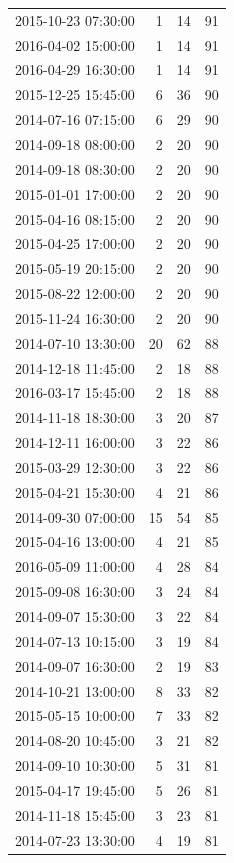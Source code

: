 \begin{tabular}{lrrr}
2015-10-23 07:30:00 & 1 & 14 & 91 \\
2016-04-02 15:00:00 & 1 & 14 & 91 \\
2016-04-29 16:30:00 & 1 & 14 & 91 \\
2015-12-25 15:45:00 & 6 & 36 & 90 \\
2014-07-16 07:15:00 & 6 & 29 & 90 \\
2014-09-18 08:00:00 & 2 & 20 & 90 \\
2014-09-18 08:30:00 & 2 & 20 & 90 \\
2015-01-01 17:00:00 & 2 & 20 & 90 \\
2015-04-16 08:15:00 & 2 & 20 & 90 \\
2015-04-25 17:00:00 & 2 & 20 & 90 \\
2015-05-19 20:15:00 & 2 & 20 & 90 \\
2015-08-22 12:00:00 & 2 & 20 & 90 \\
2015-11-24 16:30:00 & 2 & 20 & 90 \\
2014-07-10 13:30:00 & 20 & 62 & 88 \\
2014-12-18 11:45:00 & 2 & 18 & 88 \\
2016-03-17 15:45:00 & 2 & 18 & 88 \\
2014-11-18 18:30:00 & 3 & 20 & 87 \\
2014-12-11 16:00:00 & 3 & 22 & 86 \\
2015-03-29 12:30:00 & 3 & 22 & 86 \\
2015-04-21 15:30:00 & 4 & 21 & 86 \\
2014-09-30 07:00:00 & 15 & 54 & 85 \\
2015-04-16 13:00:00 & 4 & 21 & 85 \\
2016-05-09 11:00:00 & 4 & 28 & 84 \\
2015-09-08 16:30:00 & 3 & 24 & 84 \\
2014-09-07 15:30:00 & 3 & 22 & 84 \\
2014-07-13 10:15:00 & 3 & 19 & 84 \\
2014-09-07 16:30:00 & 2 & 19 & 83 \\
2014-10-21 13:00:00 & 8 & 33 & 82 \\
2015-05-15 10:00:00 & 7 & 33 & 82 \\
2014-08-20 10:45:00 & 3 & 21 & 82 \\
2014-09-10 10:30:00 & 5 & 31 & 81 \\
2015-04-17 19:45:00 & 5 & 26 & 81 \\
2014-11-18 15:45:00 & 3 & 23 & 81 \\
2014-07-23 13:30:00 & 4 & 19 & 81 \\

\end{tabular}
